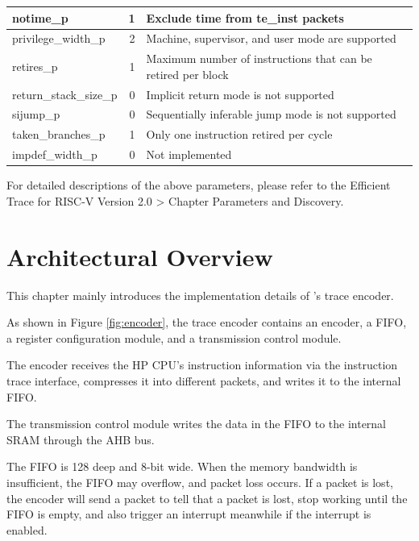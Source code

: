 \documentclass[main\_\_EN.tex]{subfiles}
\begin{document}
\begin{longtable}[c]{ |l|r|l| }
    notime\_p & 1 & Exclude time from te\_inst packets \\\hline
    privilege\_width\_p & 2 & Machine, supervisor, and user mode are supported \\\hline
    retires\_p & 1 & Maximum number of instructions that can be retired per block \\\hline
    return\_stack\_size\_p & 0 & Implicit return mode is not supported \\\hline
    sijump\_p & 0 & Sequentially inferable jump mode is not supported \\\hline
    taken\_branches\_p & 1 & Only one instruction retired per cycle \\\hline
    impdef\_width\_p & 0 & Not implemented \\\hline

 \end{longtable}

For detailed descriptions of the above parameters, please refer to the Efficient Trace for RISC-V Version 2.0 > Chapter Parameters and Discovery.



\section{Architectural Overview}
\label{sec:riscvtracenc-arch-overview}

This chapter mainly introduces the implementation details of \chipname{}'s trace encoder.

As shown in Figure \ref{fig:encoder}, the trace encoder contains an encoder, a FIFO, a register configuration module, and a transmission control module.

The encoder receives the HP CPU's instruction information via the instruction trace interface, compresses it into different packets, and writes it to the internal FIFO.

The transmission control module writes the data in the FIFO to the internal SRAM through the AHB bus.

The FIFO is 128 deep and 8-bit wide. When the memory bandwidth is insufficient, the FIFO may overflow, and packet loss occurs. If a packet is lost, the encoder will send a packet to tell that a packet is lost, stop working until the FIFO is empty, and also trigger an interrupt meanwhile if the interrupt is enabled.


\end{document}
